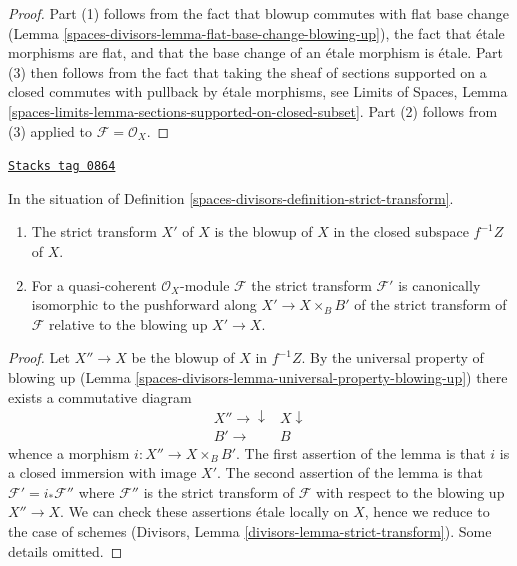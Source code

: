 \begin{proof}
Part (1) follows from the fact that blowup commutes with flat base
change (Lemma \ref{spaces-divisors-lemma-flat-base-change-blowing-up}), the fact that
\'etale morphisms are flat, and that the base change of an \'etale
morphism is \'etale. Part (3) then follows from the fact that taking
the sheaf of sections supported on a closed commutes with pullback
by \'etale morphisms, see Limits of Spaces, Lemma
\ref{spaces-limits-lemma-sections-supported-on-closed-subset}.
Part (2) follows from (3) applied to $\mathcal{F} = \mathcal{O}_X$.
\end{proof}

\begin{lemma}
\label{spaces-divisors-lemma-strict-transform}
\href{https://stacks.math.columbia.edu/tag/0864}{\texttt{Stacks tag 0864}}

In the situation of Definition \ref{spaces-divisors-definition-strict-transform}.
\begin{enumerate}
\item The strict transform $X'$ of $X$ is the blowup of $X$ in the closed
subspace $f^{-1}Z$ of $X$.
\item For a quasi-coherent $\mathcal{O}_X$-module $\mathcal{F}$ the
strict transform $\mathcal{F}'$ is canonically isomorphic to
the pushforward along $X' \to X \times_B B'$ of the strict transform of
$\mathcal{F}$ relative to the blowing up $X' \to X$.
\end{enumerate}
\end{lemma}

\begin{proof}
Let $X'' \to X$ be the blowup of $X$ in $f^{-1}Z$. By the universal
property of blowing up (Lemma \ref{spaces-divisors-lemma-universal-property-blowing-up})
there exists a commutative diagram
$$
\begin{array}{cc}X'' \longrightarrow\downarrow & X \downarrow \\ B' \longrightarrow & B\end{array}
$$
whence a morphism $i : X'' \to X \times_B B'$. The first assertion
of the lemma is that $i$ is a closed immersion with image $X'$.
The second assertion of the lemma is that $\mathcal{F}' = i_*\mathcal{F}''$
where $\mathcal{F}''$ is the strict transform of $\mathcal{F}$ with
respect to the blowing up $X'' \to X$. We can check these assertions
\'etale locally on $X$, hence we reduce to the case of schemes
(Divisors, Lemma \ref{divisors-lemma-strict-transform}).
Some details omitted.
\end{proof}

